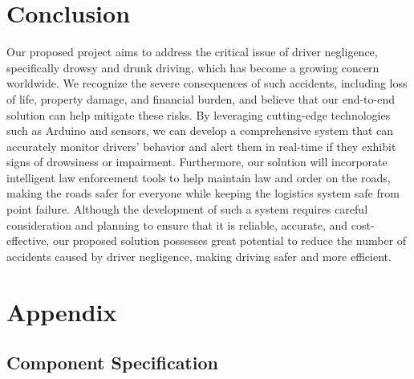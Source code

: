 \documentclass[12pt]{article}
\begin{document}
\section{Conclusion}
 Our proposed project aims to address the critical issue of driver negligence, specifically drowsy and drunk driving, which has become a growing concern worldwide. We recognize the severe consequences of such accidents, including loss of life, property damage, and financial burden, and believe that our end-to-end solution can help mitigate these risks. By leveraging cutting-edge technologies such as Arduino and sensors, we can develop a comprehensive system that can accurately monitor drivers' behavior and alert them in real-time if they exhibit signs of drowsiness or impairment. Furthermore, our solution will incorporate intelligent law enforcement tools to help maintain law and order on the roads, making the roads safer for everyone while keeping the logistics system safe from point failure. Although the development of such a system requires careful consideration and planning to ensure that it is reliable, accurate, and cost-effective, our proposed solution possesses great potential to reduce the number of accidents caused by driver negligence, making driving safer and more efficient.


\section{Appendix}

\subsection{Component Specification}
\end{document}
